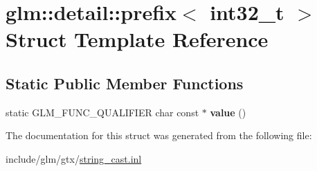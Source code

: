 \hypertarget{structglm_1_1detail_1_1prefix_3_01int32__t_01_4}{}\section{glm\+:\+:detail\+:\+:prefix$<$ int32\+\_\+t $>$ Struct Template Reference}
\label{structglm_1_1detail_1_1prefix_3_01int32__t_01_4}
\subsection*{Static Public Member Functions}
\begin{DoxyCompactItemize}
\item 
\mbox{\label{structglm_1_1detail_1_1prefix_3_01int32__t_01_4_a1e2bfac810e1195fa173ebca0dcdca57}} 
static G\+L\+M\+\_\+\+F\+U\+N\+C\+\_\+\+Q\+U\+A\+L\+I\+F\+I\+ER char const  $\ast$ {\bfseries value} ()
\end{DoxyCompactItemize}


The documentation for this struct was generated from the following file\+:\begin{DoxyCompactItemize}
\item 
include/glm/gtx/\hyperlink{string__cast_8inl}{string\+\_\+cast.\+inl}\end{DoxyCompactItemize}
